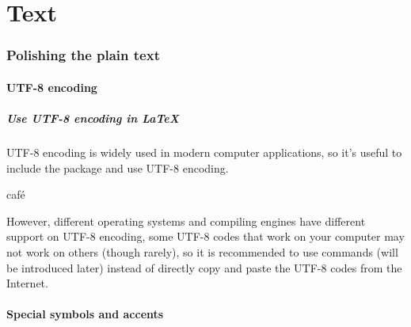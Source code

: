 \part{Text}

\section{Polishing the plain text}
\begin{frame}
\end{frame}

\subsection{UTF-8 encoding}

\begin{frame}[fragile]
	\frametitle{Use UTF-8 encoding in \LaTeX}
	UTF-8 encoding is widely used in modern computer applications, so it's useful to include the  package and use UTF-8 encoding.
	\begin{command}
		\LC{\usepackage[utf-8]{inputenc}}
	\end{command}
	\begin{example}
		café
	\end{example}
	However, different operating systems and compiling engines have different support on UTF-8 encoding, some UTF-8 codes that work on your computer may not work on others (though rarely), so it is recommended to use commands (will be introduced later) instead of directly copy and paste the UTF-8 codes from the Internet.
\end{frame}

\subsection{Special symbols and accents}

